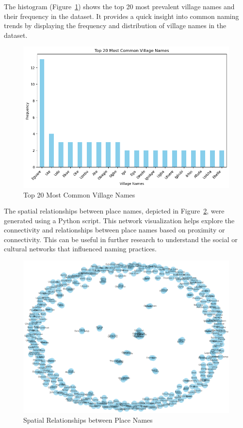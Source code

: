 The histogram (Figure~\ref{fig:histogram2}) shows the top 20 most prevalent village names and their frequency in the dataset. It provides a quick insight into common naming trends by displaying the frequency and distribution of village names in the dataset.
\begin{figure}[htb]
    \centering
    \includegraphics[width=.9\linewidth]{histogram2.png}
    \caption{Top 20 Most Common Village Names}
    \label{fig:histogram2}
\end{figure}





The spatial relationships between place names, depicted in Figure~\ref{fig:network}, were generated using a Python script. This network visualization helps explore the connectivity and relationships between place names based on proximity or connectivity. This can be useful in further research to understand the social or cultural networks that influenced naming practices.
\begin{figure}[htb]
    \centering
    \includegraphics[width=.9\linewidth]{networkanalysis.png}
    \caption{Spatial Relationships between Place Names}
    \label{fig:network}
\end{figure}

